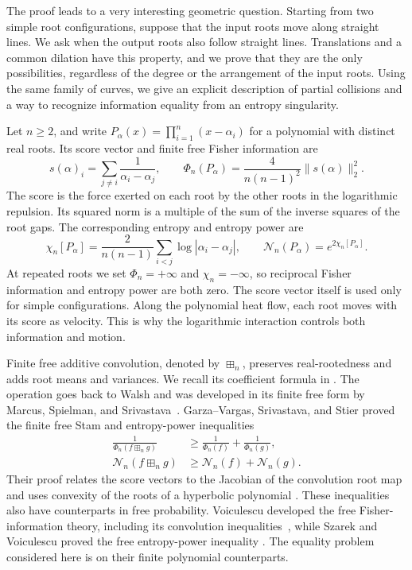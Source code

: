 \documentclass[12pt,reqno]{amsart}
\theoremstyle{definition}
\theoremstyle{remark}
\newcommand{\cN}{\mathcal N}
\begin{document}
The proof leads to a very interesting geometric question. Starting from
two simple root configurations, suppose that the input roots move
along straight lines. We ask when the output roots also follow
straight lines. Translations and a common dilation have this
property, and we prove that they are the only possibilities, regardless of the degree or the arrangement of the input roots. Using the same family of curves, we give an explicit description of partial collisions and a way to recognize information equality from an entropy singularity.

Let \(n\geq2\), and write
\(P_\alpha(x)=\prod_{i=1}^n(x-\alpha_i)\) for a polynomial with distinct
real roots.  Its score vector and finite free Fisher information are
\begin{equation}\label{eq:intro-fisher}
 s(\alpha)_i=\sum_{j\ne i}\frac{1}{\alpha_i-\alpha_j},
 \qquad
 \Phi_n(P_\alpha)=\frac{4}{n(n-1)^2}\|s(\alpha)\|_2^2.
\end{equation}
The score is the force exerted on each root by the other roots in the
logarithmic repulsion.  Its squared norm is a multiple of the sum of
the inverse squares of the root gaps.  The corresponding entropy and
entropy power are
\begin{equation}\label{eq:intro-entropy}
 \chi_n[P_\alpha]=\frac{2}{n(n-1)}
       \sum_{i<j}\log|\alpha_i-\alpha_j|,
 \qquad \cN_n(P_\alpha)=e^{2\chi_n[P_\alpha]}.
\end{equation}
At repeated roots we set \(\Phi_n=+\infty\) and \(\chi_n=-\infty\),
so reciprocal Fisher information and entropy power are both zero. The score vector itself is used only for simple configurations. Along the polynomial heat flow, each root moves with its score as
velocity. This is why the logarithmic interaction controls both information and motion.

Finite free additive convolution, denoted by \(\boxplus_n\), preserves
real-rootedness and adds root means and variances.  We recall its
coefficient formula in .  The operation goes back
to Walsh and was developed in its finite free form by Marcus, Spielman,
and Srivastava~\cite{Walsh22,MSS22}. Garza--Vargas, Srivastava, and Stier
proved the finite free Stam and entropy-power inequalities
\begin{align}
 \frac{1}{\Phi_n(f\boxplus_n g)}
 &\geq \frac{1}{\Phi_n(f)}+\frac{1}{\Phi_n(g)},
 \label{eq:intro-stam}\\
 \cN_n(f\boxplus_n g)
 &\geq \cN_n(f)+\cN_n(g).
 \label{eq:intro-epi}
\end{align}
Their proof relates the score vectors to the Jacobian of the convolution
root map and uses convexity of the roots of a hyperbolic polynomial
\cite{GVS26}. These inequalities also have counterparts in free probability.
Voiculescu developed the free Fisher-information theory, including
its convolution inequalities~\cite{Voiculescu98}, while Szarek and
Voiculescu proved the free entropy-power inequality \cite{SzarekVoiculescu96}. The equality problem considered here is on their finite polynomial counterparts.
\end{document}
